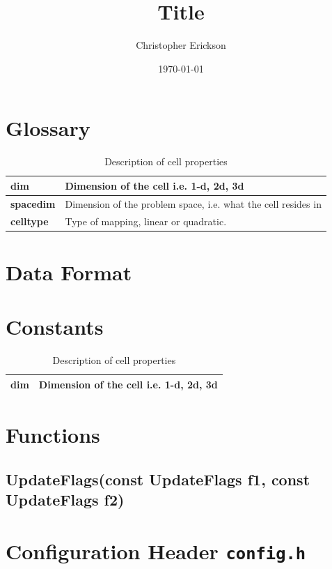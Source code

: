 \documentclass{article}
\title{Title}
\author{
  Christopher Erickson\\
}
\date{\today}
\newenvironment{formal}{%
  \def\FrameCommand{%
    \hspace{1pt}%
    {\color{darkblue}\vrule width 2pt}%
    {\color{formalshade}\vrule width 4pt}%
    \colorbox{formalshade}%
  }%
  \MakeFramed{\advance\hsize-\width\FrameRestore}%
  \noindent\hspace{-4.55pt}%
  \begin{adjustwidth}{}{7pt}%
  \vspace{2pt}\vspace{2pt}%
}
{%
  \vspace{2pt}\end{adjustwidth}\endMakeFramed%
}
\begin{document}
\maketitle
\section*{Glossary}
\begin{table}[h!]
\centering
\begin{tabularx}{\textwidth}{|l|X|}
\hline
\textbf{dim} & Dimension of the cell i.e. 1-d, 2d, 3d \\ \hline
\textbf{spacedim} & Dimension of the problem space, i.e. what the cell resides in \\ \hline
\textbf{celltype} & Type of mapping, linear or quadratic. \\ \hline
\end{tabularx}
\caption{Description of cell properties}
\end{table}
\section*{Data Format}

\section*{Constants}
\begin{table}[h!]
\centering
\begin{tabularx}{\textwidth}{|l|X|}
\hline
\textbf{dim} & Dimension of the cell i.e. 1-d, 2d, 3d \\ \hline
\end{tabularx}
\caption{Description of cell properties}
\end{table}
\section*{Functions}
\subsection{UpdateFlags(const UpdateFlags f1, const UpdateFlags f2)}

\section{Configuration Header \texttt{config.h}}
\end{document}
